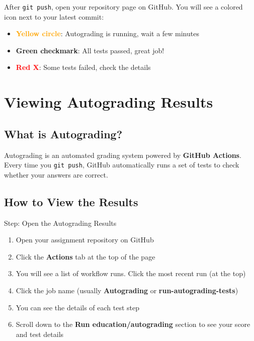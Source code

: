 \documentclass[
    a4paper,
    11pt,
    parskip=half
]{scrartcl}
\begin{document}
After \texttt{git push}, open your repository page on GitHub. You will see a colored icon next to your latest commit:

\begin{itemize}
    \item \textcolor{orange}{\textbf{Yellow circle}}: Autograding is running, wait a few minutes
    \item \textcolor{green!50!black}{\textbf{Green checkmark}}: All tests passed, great job!
    \item \textcolor{red}{\textbf{Red X}}: Some tests failed, check the details
\end{itemize}

\section{Viewing Autograding Results}
\label{sec:autograding}

\subsection{What is Autograding?}

Autograding is an automated grading system powered by \textbf{GitHub Actions}. Every time you \texttt{git push}, GitHub automatically runs a set of tests to check whether your answers are correct.

\subsection{How to View the Results}

\begin{stepbox}{Step: Open the Autograding Results}
\begin{enumerate}
    \item Open your assignment repository on GitHub
    \item Click the \textbf{Actions} tab at the top of the page
    \item You will see a list of workflow runs. Click the most recent run (at the top)
    \item Click the job name (usually \textbf{Autograding} or \textbf{run-autograding-tests})
    \item You can see the details of each test step
    \item Scroll down to the \textbf{Run education/autograding} section to see your score and test details
\end{enumerate}
\end{stepbox}
\end{document}
